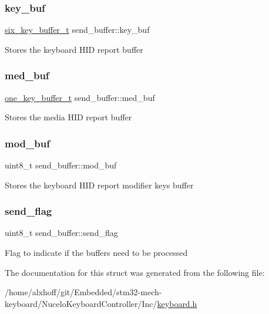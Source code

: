 \subsubsection{\texorpdfstring{key\+\_\+buf}{key\_buf}}
{\footnotesize\ttfamily \hyperlink{keyboard_8h_ade7751d5843483b986b63a84a5ea6963}{six\+\_\+key\+\_\+buffer\+\_\+t} send\+\_\+buffer\+::key\+\_\+buf}

Stores the keyboard H\+ID report buffer \mbox{\label{structsend__buffer_a50a00b397fd66c2f36dc607e82a51daf}} 
\subsubsection{\texorpdfstring{med\+\_\+buf}{med\_buf}}
{\footnotesize\ttfamily \hyperlink{keyboard_8h_aba6323f912601b5a724db813a53fdcfe}{one\+\_\+key\+\_\+buffer\+\_\+t} send\+\_\+buffer\+::med\+\_\+buf}

Stores the media H\+ID report buffer \mbox{\label{structsend__buffer_a1ed1ea0b6d0ffbe2af4f8aff77cd5d56}} 
\subsubsection{\texorpdfstring{mod\+\_\+buf}{mod\_buf}}
{\footnotesize\ttfamily uint8\+\_\+t send\+\_\+buffer\+::mod\+\_\+buf}

Stores the keyboard H\+ID report modifier keys buffer \mbox{\label{structsend__buffer_a2584076f9d2f17205d4625411b0d5808}} 
\subsubsection{\texorpdfstring{send\+\_\+flag}{send\_flag}}
{\footnotesize\ttfamily uint8\+\_\+t send\+\_\+buffer\+::send\+\_\+flag}

Flag to indicate if the buffers need to be processed 

The documentation for this struct was generated from the following file\+:\begin{DoxyCompactItemize}
\item 
/home/alxhoff/git/\+Embedded/stm32-\/mech-\/keyboard/\+Nucelo\+Keyboard\+Controller/\+Inc/\hyperlink{keyboard_8h}{keyboard.\+h}\end{DoxyCompactItemize}

